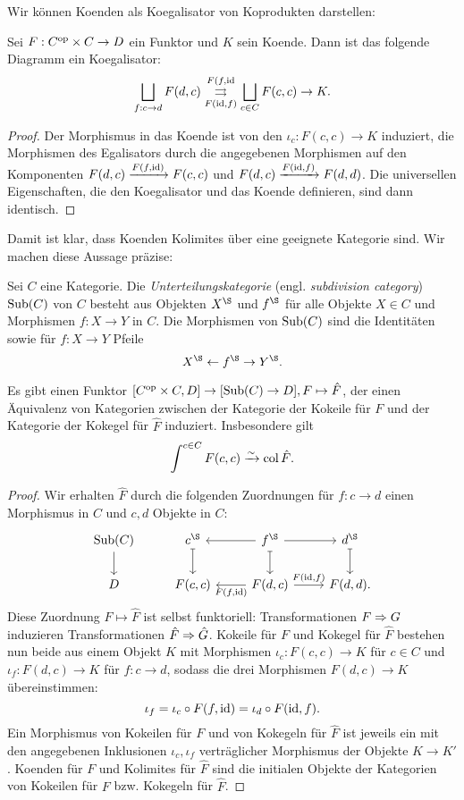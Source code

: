 Wir können Koenden als Koegalisator von Koprodukten darstellen:
\begin{lemma} \label{coend-coeq}
  Sei $F: C^\mathrm{op} \times C \to D$ ein Funktor und $K$ sein Koende. Dann
  ist das folgende Diagramm ein Koegalisator:
  \[ \bigsqcup_{f: c \to d} F(d, c)
  \overset{F(f, \operatorname{id}}{\underset{F(\operatorname{id}, f)}{\rightrightarrows}}
  \bigsqcup_{c \in C} F(c, c) \to K. \]
\end{lemma}
\begin{proof}
  Der Morphismus in das Koende ist von den $\iota_c: F(c, c) \to K$
  induziert, die Morphismen des Egalisators durch die angegebenen
  Morphismen auf den Komponenten $F(d, c) \xrightarrow{F(f, \operatorname{id})} F(c,
  c)$ und $F(d, c) \xrightarrow{F(\operatorname{id}, f)} F(d, d)$. Die universellen
  Eigenschaften, die den Koegalisator und das Koende definieren, sind
  dann identisch.
\end{proof}
Damit ist klar, dass Koenden Kolimites über eine geeignete Kategorie
sind. Wir machen diese Aussage präzise:
\begin{defn} \label{def:sub}
  Sei $C$ eine Kategorie. Die \emph{Unterteilungskategorie}
  (engl. \emph{subdivision category}) $\operatorname{Sub}(C)$ von $C$ besteht aus
  Objekten $X^\S$ und $f^\S$ für alle Objekte $X \in C$ und Morphismen
  $f: X \to Y$ in $C$. Die Morphismen von $\operatorname{Sub}(C)$ sind die
  Identitäten sowie für $f: X \to Y$ Pfeile
  \[ X^\S \from f^\S \to Y^\S. \]
\end{defn}
\begin{prop} \label{coend-col}
  Es gibt einen Funktor $[C^\mathrm{op} \times C, D] \to [\operatorname{Sub}(C) \to D], F
  \mapsto \hat{F}$, der einen Äquivalenz von Kategorien zwischen der
  Kategorie der Kokeile für $F$ und der Kategorie der Kokegel für
  $\hat{F}$ induziert. Insbesondere gilt
  \[ \int^{c \in C} F(c, c) \xrightarrow[]{\sim} \operatorname{col} \hat{F}. \]
\end{prop}
\begin{proof}
  Wir erhalten $\hat{F}$ durch die folgenden Zuordnungen für $f: c \to
  d$ einen Morphismus in $C$ und $c, d$ Objekte in $C$:
  \[ \begin{tikzcd}
    \Sub(C) \arrow{d}
    & c^\S \arrow[mapsto]{d}
    & \arrow{l} f^\S \arrow[mapsto]{d} \arrow{r}
    & d^\S \arrow[mapsto]{d} \\
    D
    & F(c, c)
    & \arrow{l}{F(f, \id)} F(d, c) \arrow{r}{F(\id, f)}
    & F(d, d).
  \end{tikzcd} \]
  Diese Zuordnung $F \mapsto \hat{F}$ ist selbst funktoriell:
  Transformationen $F \Rightarrow G$ induzieren Transformationen $\hat{F}
  \Rightarrow \hat{G}$. Kokeile für $F$ und Kokegel für $\hat{F}$ bestehen
  nun beide aus einem Objekt $K$ mit Morphismen $\iota_c: F(c, c) \to
  K$ für $c \in C$ und $\iota_f: F(d, c) \to K$ für $f: c \to d$,
  sodass die drei Morphismen $F(d, c) \to K$ übereinstimmen:
  \[ \iota_f = \iota_c \circ F(f, \operatorname{id}) = \iota_d \circ F(\operatorname{id}, f). \]
  Ein Morphismus von Kokeilen für $F$ und von Kokegeln für $\hat{F}$
  ist jeweils ein mit den angegebenen Inklusionen $\iota_c, \iota_f$
  verträglicher Morphismus der Objekte $K \to K'$. Koenden für $F$ und
  Kolimites für $\hat{F}$ sind die initialen Objekte der Kategorien
  von Kokeilen für $F$ bzw. Kokegeln für $\hat{F}$.
\end{proof}
